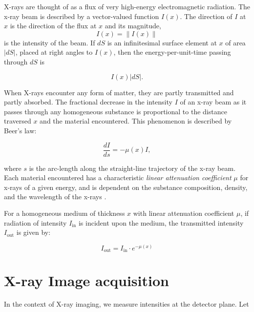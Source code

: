 \documentclass[nomenclature, english, bibtex]{kththesis}
\numberwithin{listing}{chapter}
\begin{document}
X-rays are thought of as a flux of very high-energy electromagnetic radiation. The x-ray beam is
described by a vector-valued function $I(x)$. The direction of $I$ at $x$ is the direction of the flux at $x$ and
its magnitude,
\begin{equation}
    I (x) = \lVert I(x) \rVert
\end{equation}
is the intensity of the beam. If $dS$ is an infinitesimal surface element at $x$ of area
$|dS|$, placed at right angles to $I(x)$, then the energy-per-unit-time passing through $dS$ is \cite[p.~56]{epstein2008}

\begin{equation}
    I (x) |dS|.
\end{equation}

When X-rays encounter any form of matter, they are partly transmitted and partly absorbed.
The fractional decrease in the intensity $I$ of an x-ray beam as it passes
through any homogeneous substance is proportional to the distance traversed $x$
and the material encountered\cite[p.~11]{cullityElementsXrayDiffraction2014}.
This phenomenon is described by Beer's law:

\begin{equation}
    \frac{dI}{ds} = -\mu(x)I,
    \label{eq:BeerLambert}
\end{equation}

where $s$ is the arc-length along the straight-line trajectory of the x-ray beam.
Each material encountered has a characteristic \textit{linear attenuation coefficient} $\mu$ for x-rays of a
given energy, and is dependent on the substance composition, density, and the wavelength of the x-rays \cite[p.~57]{epstein2008}.

For a homogeneous medium of thickness $x$ with linear attenuation coefficient $\mu$, if radiation of intensity
$I_{\text{in}}$ is incident upon the medium, the transmitted intensity $I_{\text{out}}$ is given by:

\begin{equation}
I_{\text{out}} = I_{\text{in}} \cdot e^{-\mu(x)}
\label{eq:beer_lambert}
\end{equation}

\section{X-ray Image acquisition}

In the context of X-ray imaging, we measure intensities at the detector plane. Let
\end{document}
